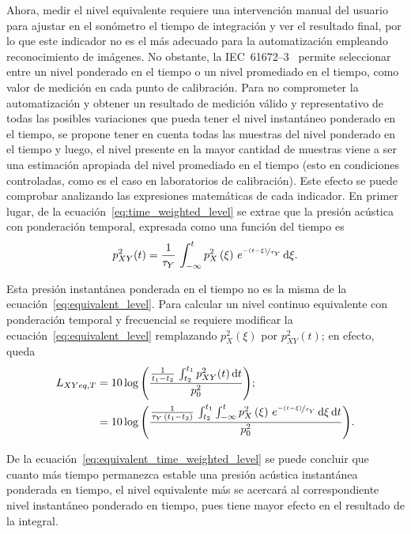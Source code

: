 Ahora, medir el nivel equivalente requiere una intervención manual del usuario para ajustar en el sonómetro el tiempo de
integración y ver el resultado final, por lo que este indicador no es el más adecuado para la automatización empleando
reconocimiento de imágenes.
No obstante, la \mbox{IEC 61672--3}~\citeyearpar{IEC_TC29_2013_3} permite seleccionar entre un nivel ponderado en el
tiempo o un nivel promediado en el tiempo, como valor de medición en cada punto de calibración.
Para no comprometer la automatización y obtener un resultado de medición válido y representativo de todas las posibles
variaciones que pueda tener el nivel instantáneo ponderado en el tiempo, se propone tener en cuenta todas las muestras
del nivel ponderado en el tiempo y luego, el nivel presente en la mayor cantidad de muestras viene a ser una estimación
apropiada del nivel promediado en el tiempo (esto en condiciones controladas, como es el caso en laboratorios de
calibración).
Este efecto se puede comprobar analizando las expresiones matemáticas de cada indicador.
En primer lugar, de la ecuación~\eqref{eq:time_weighted_level} se extrae que la presión acústica con ponderación
temporal, expresada como una función del tiempo es
%
\begin{equation}
    p_{XY}^2(t) = \frac{1}{\tau_{Y}}\,\int_{-\infty}^t p_X^2\left(\xi\right)\,
    e^{\nicefrac{-\left(t - \xi\right)}{\tau_Y}}\,\mathrm{d}\xi.
\end{equation}

Esta presión instantánea ponderada en el tiempo no es la misma de la ecuación~\eqref{eq:equivalent_level}.
Para calcular un nivel continuo equivalente con ponderación temporal y frecuencial se requiere modificar la
ecuación~\eqref{eq:equivalent_level} remplazando $p_X^2(\xi)$ por $p_{XY}^2(t)$; en efecto, queda
%
\begin{align}
    L_{XYeq,T} &= 10\log{\left(\frac{\frac{1}{t_1 - t_2}\,\int_{t_2}^{t_1} p_{XY}^2(t)\,\mathrm{d}t}{p_0^2}\right)}; \nonumber \\
    &= 10\log{\left(\frac{\frac{1}{\tau_Y\,\left(t_1 - t_2\right)}\,
    \int_{t_2}^{t_1} \int_{-\infty}^t p_X^2\left(\xi\right)\,
    e^{\nicefrac{-\left(t - \xi\right)}{\tau_Y}}\,\mathrm{d}\xi\,\mathrm{d}t}{p_0^2}\right)}. \label{eq:equivalent_time_weighted_level}
\end{align}

De la ecuación~\eqref{eq:equivalent_time_weighted_level} se puede concluir que cuanto más tiempo permanezca estable
una presión acústica instantánea ponderada en tiempo, el nivel equivalente más se acercará al correspondiente nivel
instantáneo ponderado en tiempo, pues tiene mayor efecto en el resultado de la integral.

